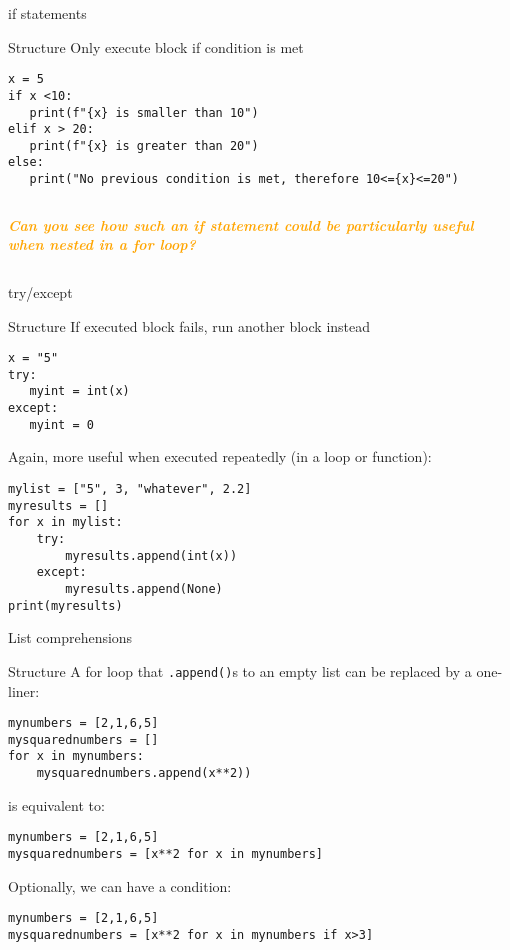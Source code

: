 \documentclass[compress]{beamer}
\newcommand{\question}[1]{
	\begin{frame}[plain]
		\begin{columns}
			\column{.3\textwidth}
			\makebox[\columnwidth]{
				\texttt{[image: mannetje.png]}}
			\column{.7\textwidth}
			\large
			\textcolor{orange}{\textbf{\emph{#1}}}
		\end{columns}
\end{frame}}
\begin{document}
\begin{frame}[fragile]{if statements}
	\begin{block}{Structure}
		Only execute block if condition is met
	\end{block}
	\begin{lstlisting}
x = 5
if x <10:
   print(f"{x} is smaller than 10")
elif x > 20:
   print(f"{x} is greater than 20")
else:
   print("No previous condition is met, therefore 10<={x}<=20")
\end{lstlisting}

\end{frame}


\question{Can you see how such an if statement could be particularly useful when nested in a for loop?}



\begin{frame}[fragile]{try/except}
\begin{block}{Structure}
If executed block fails, run another block instead
\end{block}
\begin{lstlisting}
x = "5"
try: 
   myint = int(x)
except:
   myint = 0
\end{lstlisting}

\pause 
\small{Again, more useful when executed repeatedly (in a loop or function):}
\begin{lstlisting}
mylist = ["5", 3, "whatever", 2.2]
myresults = []
for x in mylist:
    try: 
        myresults.append(int(x))
    except:
        myresults.append(None)
print(myresults)
\end{lstlisting}
\end{frame}







\begin{frame}[fragile]{List comprehensions}
\begin{block}{Structure}
A for loop that \texttt{.append()}s to an empty list can be replaced by a one-liner:
\end{block}
\begin{lstlisting}
mynumbers = [2,1,6,5]
mysquarednumbers = []
for x in mynumbers:
    mysquarednumbers.append(x**2))
\end{lstlisting}
is equivalent to:
\begin{lstlisting}
mynumbers = [2,1,6,5]
mysquarednumbers = [x**2 for x in mynumbers]
\end{lstlisting}

\pause 
Optionally, we can have a condition:
\begin{lstlisting}
mynumbers = [2,1,6,5]
mysquarednumbers = [x**2 for x in mynumbers if x>3]
\end{lstlisting}

\end{frame}
\end{document}
